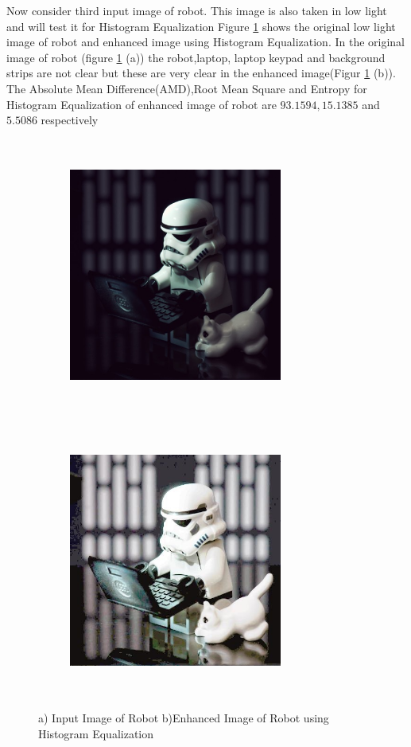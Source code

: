 Now consider third input image of robot. This image is also taken in low light and will test it for Histogram Equalization Figure \ref{fig:robotHistEq} shows the original low light image of robot and enhanced image using  Histogram Equalization. In the original image of robot (figure \ref{fig:robotHistEq} (a))  the robot,laptop, laptop keypad and background strips are not clear but these are very clear in the enhanced image(Figur \ref{fig:robotHistEq} (b)). The Absolute Mean Difference(AMD),Root Mean Square and Entropy for  Histogram Equalization of enhanced image of robot are $93.1594, 15.1385$ and $5.5086$ respectively      



\begin{figure}[!htb]
	\begin{subfigure}{8cm}
		\centering    
    	\includegraphics[width=7cm,height=9cm,keepaspectratio]{images/ch5/robot_input.jpg}
    	\caption{} 
    \end{subfigure}
  	\begin{subfigure}{6cm}
  		\centering
  		\includegraphics[width=7cm,height=9cm,keepaspectratio]{images/ch5/robot_hist_equ.jpg}
   		\caption{}
  	\end{subfigure}
  	\caption{a) Input Image of Robot b)Enhanced Image of Robot using Histogram Equalization}
  	\label{fig:robotHistEq}
\end{figure}



